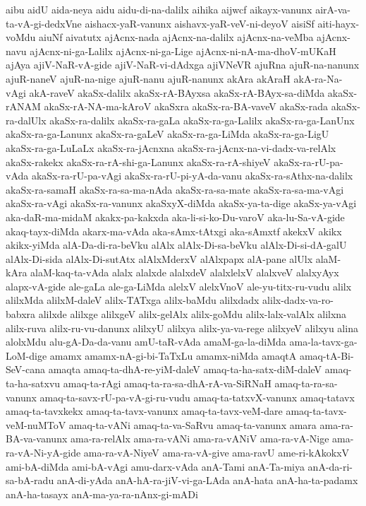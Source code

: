 {aibu
aidU
aida-neya
aidu
aidu-di-na-dalilx
aihika
aijwcf
aikayx-vanunx
airA-va-ta-vA-gi-dedxVne
aishacx-yaR-vanunx
aishavx-yaR-veV-ni-deyoV
aisiSf
aiti-hayx-voMdu
aiuNf
aivatutx
ajAcnx-nada
ajAcnx-na-dalilx
ajAcnx-na-veMba
ajAcnx-navu
ajAcnx-ni-ga-Lalilx
ajAcnx-ni-ga-Lige
ajAcnx-ni-nA-ma-dhoV-mUKaH
ajAya
ajiV-NaR-vA-gide
ajiV-NaR-vi-dAdxga
ajiVNeVR
ajuRna
ajuR-na-nanunx
ajuR-naneV
ajuR-na-nige
ajuR-nanu
ajuR-nanunx
akAra
akAraH
akA-ra-Na-vAgi
akA-raveV
akaSx-dalilx
akaSx-rA-BAyxsa
akaSx-rA-BAyx-sa-diMda
akaSx-rANAM
akaSx-rA-NA-ma-kAroV
akaSxra
akaSx-ra-BA-vaveV
akaSx-rada
akaSx-ra-dalUlx
akaSx-ra-dalilx
akaSx-ra-gaLa
akaSx-ra-ga-Lalilx
akaSx-ra-ga-LanUnx
akaSx-ra-ga-Lanunx
akaSx-ra-gaLeV
akaSx-ra-ga-LiMda
akaSx-ra-ga-LigU
akaSx-ra-ga-LuLaLx
akaSx-ra-jAcnxna
akaSx-ra-jAcnx-na-vi-dadx-va-relAlx
akaSx-rakekx
akaSx-ra-rA-shi-ga-Lanunx
akaSx-ra-rA-shiyeV
akaSx-ra-rU-pa-vAda
akaSx-ra-rU-pa-vAgi
akaSx-ra-rU-pi-yA-da-vanu
akaSx-ra-sAthx-na-dalilx
akaSx-ra-samaH
akaSx-ra-sa-ma-nAda
akaSx-ra-sa-mate
akaSx-ra-sa-ma-vAgi
akaSx-ra-vAgi
akaSx-ra-vanunx
akaSxyX-diMda
akaSx-ya-ta-dige
akaSx-ya-vAgi
aka-daR-ma-midaM
akakx-pa-kakxda
aka-li-si-ko-Du-varoV
aka-lu-Sa-vA-gide
akaq-tayx-diMda
akarx-ma-vAda
aka-sAmx-tAtxgi
aka-sAmxtf
akekxV
akikx
akikx-yiMda
alA-Da-di-ra-beVku
alAlx
alAlx-Di-sa-beVku
alAlx-Di-si-dA-galU
alAlx-Di-sida
alAlx-Di-sutAtx
alAlxMderxV
alAlxpapx
alA-pane
alUlx
alaM-kAra
alaM-kaq-ta-vAda
alalx
alalxde
alalxdeV
alalxlelxV
alalxveV
alalxyAyx
alapx-vA-gide
ale-gaLa
ale-ga-LiMda
alelxV
alelxVnoV
ale-yu-titx-ru-vudu
alilx
alilxMda
alilxM-daleV
alilx-TATxga
alilx-baMdu
alilxdadx
alilx-dadx-va-ro-babxra
alilxde
alilxge
alilxgeV
alilx-gelAlx
alilx-goMdu
alilx-lalx-valAlx
alilxna
alilx-ruva
alilx-ru-vu-danunx
alilxyU
alilxya
alilx-ya-va-rege
alilxyeV
alilxyu
alina
alolxMdu
alu-gA-Da-da-vanu
amU-taR-vAda
amaM-ga-la-diMda
ama-la-tavx-ga-LoM-dige
amamx
amamx-nA-gi-bi-TaTxLu
amamx-niMda
amaqtA
amaq-tA-Bi-SeV-cana
amaqta
amaq-ta-dhA-re-yiM-daleV
amaq-ta-ha-satx-diM-daleV
amaq-ta-ha-satxvu
amaq-ta-rAgi
amaq-ta-ra-sa-dhA-rA-va-SiRNaH
amaq-ta-ra-sa-vanunx
amaq-ta-savx-rU-pa-vA-gi-ru-vudu
amaq-ta-tatxvX-vanunx
amaq-tatavx
amaq-ta-tavxkekx
amaq-ta-tavx-vanunx
amaq-ta-tavx-veM-dare
amaq-ta-tavx-veM-nuMToV
amaq-ta-vANi
amaq-ta-va-SaRvu
amaq-ta-vanunx
amara
ama-ra-BA-va-vanunx
ama-ra-relAlx
ama-ra-vANi
ama-ra-vANiV
ama-ra-vA-Nige
ama-ra-vA-Ni-yA-gide
ama-ra-vA-NiyeV
ama-ra-vA-give
ama-ravU
ame-ri-kAkokxV
ami-bA-diMda
ami-bA-vAgi
amu-darx-vAda
anA-Tami
anA-Ta-miya
anA-da-ri-sa-bA-radu
anA-di-yAda
anA-hA-ra-jiV-vi-ga-LAda
anA-hata
anA-ha-ta-padamx
anA-ha-tasayx
anA-ma-ya-ra-nAnx-gi-mADi
}
